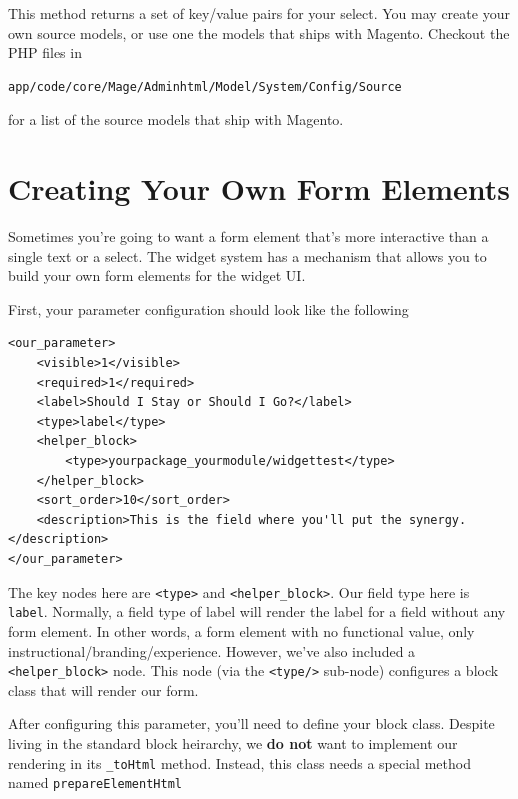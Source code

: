 \documentclass[oneside]{book}
\begin{document}
This method returns a set of key/value pairs for your select. You may create your own source models, or use one the models that ships with Magento.  Checkout the PHP files in 

\begin{lstlisting}
app/code/core/Mage/Adminhtml/Model/System/Config/Source

\end{lstlisting}


for a list of the source models that ship with Magento. 

\section{Creating Your Own Form Elements}

Sometimes you're going to want a form element that's more interactive than a single text or a select.  The widget system has a mechanism that allows you to build your own form elements for the widget UI.  

First, your parameter configuration should look like the following

\begin{lstlisting}
<our_parameter>
    <visible>1</visible>
    <required>1</required>
    <label>Should I Stay or Should I Go?</label>
    <type>label</type>
    <helper_block>
        <type>yourpackage_yourmodule/widgettest</type>              
    </helper_block>
    <sort_order>10</sort_order>
    <description>This is the field where you'll put the synergy.</description>          
</our_parameter>

\end{lstlisting}


The key nodes here are \footnotesize\texttt{\textless type\textgreater } \normalsize  and \footnotesize\texttt{\textless helper\_block\textgreater }\normalsize.  Our field type here is \footnotesize\texttt{label}\normalsize.  Normally, a field type of label will render the label for a field without any form element.  In other words, a form element with no functional value, only instructional/branding/experience.  However, we've also included a \footnotesize\texttt{\textless helper\_block\textgreater } \normalsize  node.  This node (via the \footnotesize\texttt{\textless type/\textgreater } \normalsize  sub-node) configures a block class that will render our form.  

After configuring this parameter, you'll need to define your block class.  Despite living in the standard block heirarchy, we \textbf{do not} want to implement our rendering in its \footnotesize\texttt{\_toHtml} \normalsize  method.  Instead, this class needs a special method named \footnotesize\texttt{prepareElementHtml} \normalsize 
\end{document}
